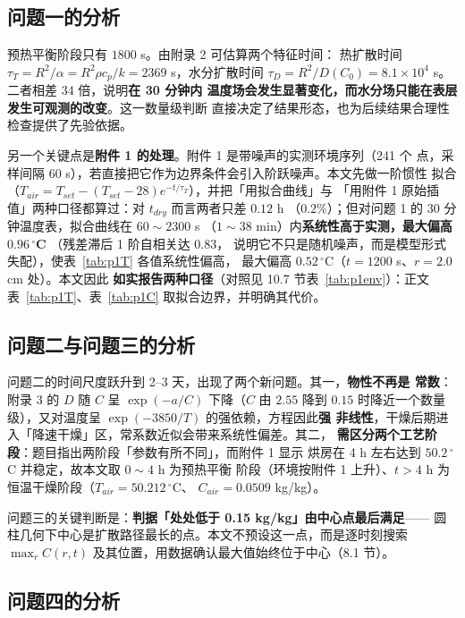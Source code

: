 \subsection{问题一的分析}

预热平衡阶段只有 $1800$ s。由附录 2 可估算两个特征时间：
热扩散时间 $\tau_T=R^2/\alpha=R^2\rho c_p/k=2369$ s，水分扩散时间
$\tau_D=R^2/D(C_0)=8.1\times10^4$ s。二者相差 34 倍，说明\textbf{在 30 分钟内
温度场会发生显著变化，而水分场只能在表层发生可观测的改变}。这一数量级判断
直接决定了结果形态，也为后续结果合理性检查提供了先验依据。

另一个关键点是\textbf{附件 1 的处理}。附件 1 是带噪声的实测环境序列（241 个
点，采样间隔 60 s），若直接把它作为边界条件会引入阶跃噪声。本文先做一阶惯性
拟合（$T_{air}=T_{set}-(T_{set}-28)e^{-t/\tau_T}$），并把「用拟合曲线」与
「用附件 1 原始插值」两种口径都算过：对 $t_{dry}$ 而言两者只差 $0.12$ h
（$0.2\%$）；但对问题 1 的 30 分钟温度表，拟合曲线在 $60\!\sim\!2300$ s
（$1\!\sim\!38$ min）内\textbf{系统性高于实测，最大偏高 $0.96\,^\circ$C}
（残差滞后 1 阶自相关达 $0.83$，
说明它不只是随机噪声，而是模型形式失配），使表~\ref{tab:p1T} 各值系统性偏高，
最大偏高 $0.52\,^\circ$C（$t=1200$ s、$r=2.0$ cm 处）。本文因此
\textbf{如实报告两种口径}（对照见 10.7 节表~\ref{tab:p1env}）：正文
表~\ref{tab:p1T}、表~\ref{tab:p1C} 取拟合边界，并明确其代价。

\subsection{问题二与问题三的分析}

问题二的时间尺度跃升到 2--3 天，出现了两个新问题。其一，\textbf{物性不再是
常数}：附录 3 的 $D$ 随 $C$ 呈 $\exp(-a/C)$ 下降（$C$ 由 $2.55$ 降到 $0.15$
时降近一个数量级），又对温度呈 $\exp(-3850/T)$ 的强依赖，方程因此\textbf{强
非线性}，干燥后期进入「降速干燥」区，常系数近似会带来系统性偏差。其二，
\textbf{需区分两个工艺阶段}：题目指出两阶段「参数有所不同」，而附件 1 显示
烘房在 4 h 左右达到 $50.2\,^\circ$C 并稳定，故本文取 $0\sim4$ h 为预热平衡
阶段（环境按附件 1 上升）、$t>4$ h 为恒温干燥阶段（$T_{air}=50.212\,^\circ$C、
$C_{air}=0.0509$ kg/kg）。

问题三的关键判断是：\textbf{判据「处处低于 0.15 kg/kg」由中心点最后满足}——
圆柱几何下中心是扩散路径最长的点。本文不预设这一点，而是逐时刻搜索
$\max_r C(r,t)$ 及其位置，用数据确认最大值始终位于中心（8.1 节）。

\subsection{问题四的分析}

